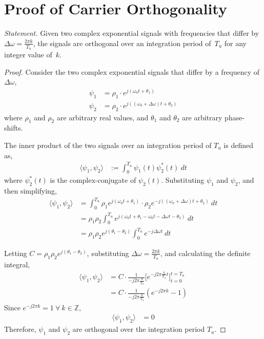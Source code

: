 \documentclass[class=report,11pt,crop=false]{standalone}
\begin{document}
\chapter{Proof of  Carrier Orthogonality \label{sect:proofs_ofdm-orthog}}

\emph{Statement.}
Given two complex exponential signals with frequencies that differ by \(\Delta\omega = \frac{2\pi k}{T_u}\), the signals are orthogonal over an integration period of~\(T_u\) for any integer value of~\(k\).

\begin{proof}
    Consider the two complex exponential signals that differ by a frequency of \(\Delta\omega\),
    \begin{align}
        \psi_1 &= \rho_1 \cdot e^{j(\omega_0 t + \theta_1)} \\
        \psi_2 &= \rho_2 \cdot e^{j((\omega_0 + \Delta\omega)t + \theta_2)}
    \end{align}
    where \(\rho_1\) and \(\rho_2\) are arbitrary real values, and \(\theta_1\) and  \(\theta_2\) are arbitrary phase-shifts.

    The inner product of the two signals over an integration period of \(T_u\) is defined as,
        \setlength{\jot}{10pt}
        \begin{align}
            \langle \psi_1, \psi_2 \rangle &:= \int_0^{T_u} \psi_1(t) \psi_2^*(t) \: dt
        \end{align}
    where \(\psi_2^*(t)\) is the complex-conjugate of \(\psi_2(t)\). Substituting \(\psi_1\) and \(\psi_2\), and then simplifying,
    \begin{align}
        \langle \psi_1, \psi_2 \rangle &= \int_0^{T_u} \rho_1 e^{j(\omega_0 t + \theta_1)} \cdot \rho_2 e^{-j((\omega_0 + \Delta\omega)t + \theta_2)} \: dt \\
        &= \rho_1 \rho_2 \int_0^{T_u} e^{j(\omega_0 t + \theta_1 - \omega_0 t - \Delta\omega t - \theta_2)} \: dt \\
        &= \rho_1 \rho_2 e^{j(\theta_1 - \theta_2)} \int_0^{T_u} e^{-j \Delta\omega t} \: dt
    \end{align}

    Letting \(C = \rho_1 \rho_2 e^{j(\theta_1 - \theta_2)}\), substituting \(\Delta\omega = \frac{2\pi k}{T_u}\), and calculating the definite integral,
    \begin{align}
        \langle \psi_1, \psi_2 \rangle &= C \cdot \frac{1}{-j2\pi\frac{k}{T_u}} \bigg[ e^{-j2\pi\frac{k}{T_u} t} \bigg]^{t=T_u}_{t=0} \\
        &= C \cdot \frac{1}{-j2\pi\frac{k}{T_u}} (e^{-j2\pi k} - 1)
    \end{align}
    Since \(e^{-j2\pi k} = 1 \: \forall \: k \in \mathbb{Z}\),
    \begin{align}
        \langle \psi_1, \psi_2 \rangle &= 0
    \end{align}
    Therefore, \(\psi_1\) and \(\psi_2\) are orthogonal over the integration period \(T_u\).
\end{proof}

\ifstandalone
% 
\printnoidxglossary[type=\acronymtype,nonumberlist]
\fi
\end{document}
